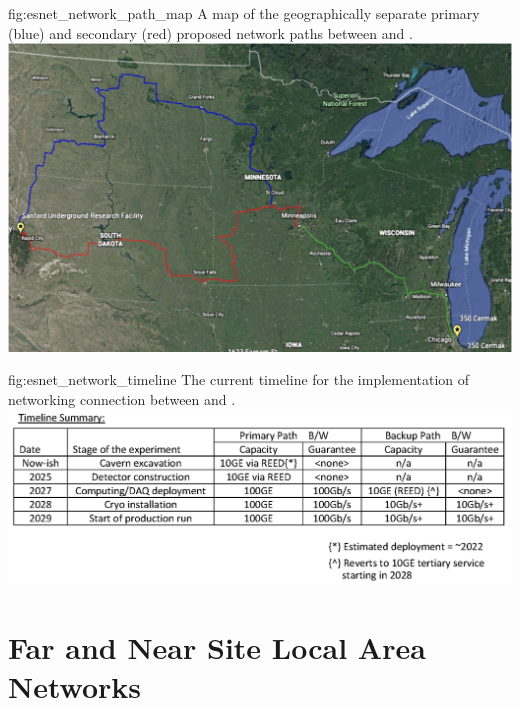 \documentclass[../main-v1.tex]{subfiles}
\begin{document}
\begin{dunefigure}
{fig:esnet_network_path_map} 
{A map of the geographically separate primary (blue) and secondary (red) proposed network paths between  and . %
}
\includegraphics[width=0.9\columnwidth]{graphics/Networking/DUNE_ESNet_network_path.png}
\end{dunefigure}

\begin{dunefigure}
{fig:esnet_network_timeline} 
{The current timeline for the implementation of networking connection between  and .}
\includegraphics[width=0.9\columnwidth]{graphics/Networking/networking_timeline.png}
\end{dunefigure}


\section{Far and Near Site Local Area Networks}
\end{document}
